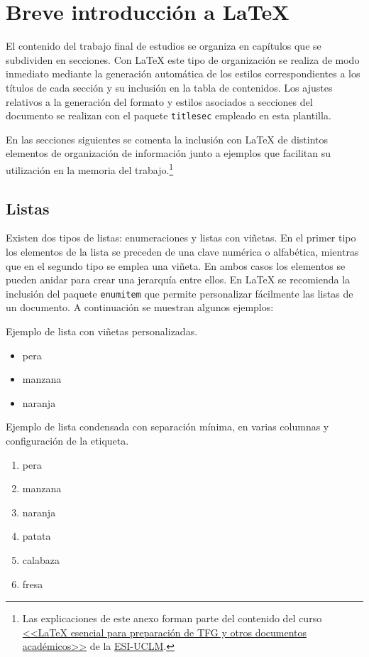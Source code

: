 \chapter{Breve introducción a \LaTeX}
\label{cap:AnexoB}

El contenido del trabajo final de estudios se organiza en capítulos que se subdividen en secciones. Con \LaTeX{} este tipo de organización se realiza de modo inmediato mediante la generación automática de los estilos correspondientes a los títulos de cada sección y su inclusión en la tabla de contenidos. Los ajustes relativos a la generación del formato y estilos asociados a secciones del documento se realizan con el paquete \texttt{titlesec} empleado en esta plantilla.

En las secciones siguientes se comenta la inclusión con \LaTeX{} de distintos elementos de organización de información junto a ejemplos que facilitan su  utilización en la memoria del trabajo.\footnote{Las explicaciones de este anexo forman parte del contenido del curso \href{https://visilab.etsii.uclm.es/?page_id=1468}{<<\LaTeX{} esencial para preparación de TFG y otros documentos académicos>>} de la \href{https://esi.uclm.es/}{ESI-UCLM}.}




\section{Listas}
\label{sec:ejListas}
Existen dos tipos de listas: enumeraciones y listas con viñetas. En el primer tipo los elementos de la lista se preceden de una clave numérica o alfabética, mientras que en el segundo tipo se emplea una viñeta. En ambos casos los elementos se pueden anidar para crear una jerarquía entre ellos. En \LaTeX{} se recomienda la inclusión del paquete \texttt{enumitem} que permite personalizar fácilmente las listas de un documento. A continuación se muestran algunos ejemplos:


\noindent Ejemplo de lista con viñetas personalizadas. 
\begin{itemize}
	\item pera
	\item[\ding{43}] manzana %
	\item[\faAward] naranja
\end{itemize}


\noindent Ejemplo de lista condensada con separación mínima, en varias columnas y configuración de la etiqueta.
\begin{multicols}{2} %
	\begin{enumerate}[(1),noitemsep]
		\item pera
		\item manzana
		\item naranja
		\item patata
		\item calabaza
		\item fresa
	\end{enumerate}
\end{multicols}


